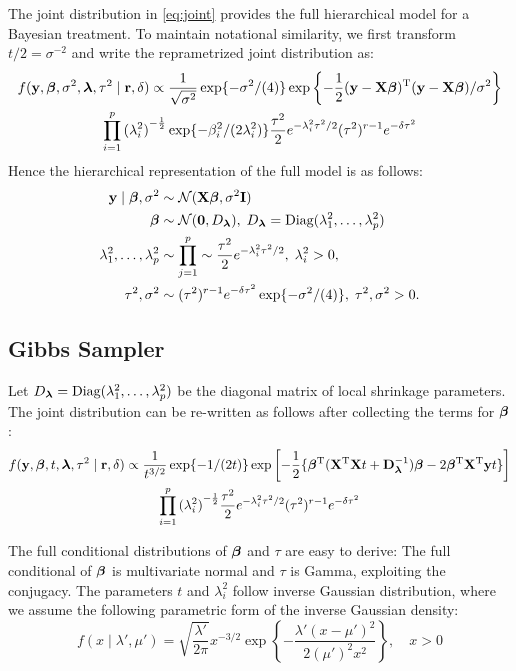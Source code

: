\documentclass[11pt]{article}
\begin{document}
The joint distribution in \eqref{eq:joint} provides the full hierarchical model for a Bayesian treatment. To maintain notational similarity, we first transform $t/2 = \sigma^{-2}$ and write the 
reprametrized joint distribution as: 
\begin{multline}
f({\bf y}, \boldsymbol{\beta}, \sigma^2, \boldsymbol{\lambda}, \tau^2 \mid {\bf r}, \delta) \propto 
\frac{1}{\sqrt{\sigma^2}} \exp\{-{\sigma^2}/({4}) \} \exp \left\{- \frac{1}{2} ({\bf y} - {\bf X} \boldsymbol{\beta})^{{\rm T}}({\bf y} - {\bf X} \boldsymbol{\beta})/ \sigma^2 \right\} \\
\prod_{i=1}^{p} {(\lambda_i^2)}^{-\frac{1}{2}} \exp\{-\beta_i^2/(2\lambda_i^2)\} \frac{\tau^2}{2} e^{-\lambda_i^2\tau^2/2} (\tau^2)^{r-1} e^{-\delta \tau^2} \label{eq:joint}
\end{multline}
Hence the hierarchical representation of the full model is as follows:
\begin{align}
{\bf y} \mid \boldsymbol{\beta}, \sigma^2 & \sim \mathcal{N}({\bf X} \boldsymbol{\beta}, \sigma^2 {\bf I}) \\
\boldsymbol{\beta} & \sim \mathcal{N}({\bf 0}, D_{\boldsymbol{\lambda}}), \; D_{\boldsymbol{\lambda}} = \text{Diag}(\lambda_1^2, \ldots, \lambda_p^2) \\
\lambda_1^2, \ldots, \lambda_p^2 & \sim \prod_{j=1}^{p} \sim \frac{\tau^2}{2} e^{-\lambda_i^2\tau^2/2}, \; \lambda_i^2 > 0, \\
\tau^2, \sigma^2 & \sim (\tau^2)^{r-1} e^{-\delta \tau^2} \exp\{-{\sigma^2}/({4}) \}, \; \tau^2, \sigma^2 > 0. 
\end{align}


\subsection{Gibbs Sampler}

Let $ D_{\boldsymbol{\lambda}} = \text{Diag}(\lambda_1^2, \ldots, \lambda_p^2)$ be the diagonal matrix of local shrinkage parameters. The joint distribution can be re-written as follows after collecting the terms for $\boldsymbol{\beta}$: 
\begin{multline}
f({\bf y}, \boldsymbol{\beta}, t, \boldsymbol{\lambda}, \tau^2 \mid {\bf r}, \delta) \propto 
\frac{1}{t^{3/2}} \exp\{-{1}/({2 t}) \} \exp \left[- \frac{1}{2} \{ \boldsymbol{\beta}^{\rm T}({\bf X}^{\rm T} {\bf X} t + {\bf D}_{\boldsymbol{\lambda}}^{-1})\boldsymbol{\beta} - 2 \boldsymbol{\beta}^{\rm T} {\bf X}^{\rm T} {\bf y} t \}\right] \\
\prod_{i=1}^{p} {(\lambda_i^2)}^{-\frac{1}{2}} \frac{\tau^2}{2} e^{-\lambda_i^2\tau^2/2} (\tau^2)^{r-1} e^{-\delta \tau^2} \label{eq:joint-beta}
\end{multline}

The full conditional distributions of $\boldsymbol{\beta}$ and $\tau$ are easy to derive: The full conditional of $\boldsymbol{\beta}$ is multivariate normal and $\tau$ is Gamma, exploiting the conjugacy. The parameters $t$ and $\lambda_i^2$ follow inverse Gaussian distribution, where we assume the following parametric form of the inverse Gaussian density:
\[
f(x \mid \lambda', \mu') = \sqrt{\frac{\lambda'}{2\pi}} x^{-3/2} \exp\left\{ - \frac{\lambda'(x-\mu')^2}{2(\mu')^2 x^2} \right \}, \quad x > 0 
\]
\end{document}
